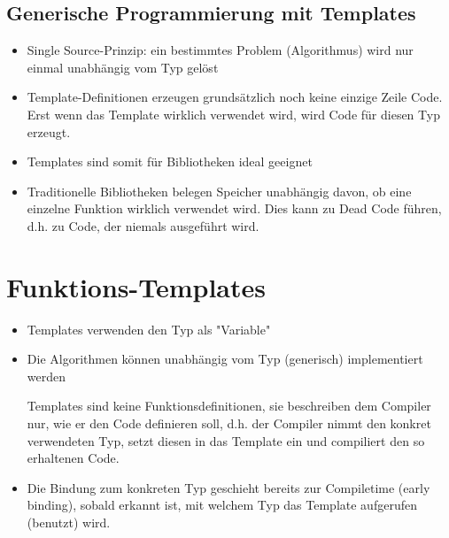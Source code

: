\subsection{Generische Programmierung mit Templates}
\label{sec:Generische Programmierung mit Templates}
\begin{itemize}
	\item Single Source-Prinzip: ein bestimmtes Problem (Algorithmus) wird nur einmal unabhängig vom Typ gelöst
	\item Template-Definitionen erzeugen grundsätzlich noch keine einzige Zeile Code. Erst wenn das Template wirklich verwendet wird, wird Code für diesen Typ erzeugt.
	\item Templates sind somit für Bibliotheken ideal geeignet
	\item Traditionelle Bibliotheken belegen Speicher unabhängig davon, ob eine einzelne Funktion wirklich verwendet wird. Dies kann zu Dead Code führen, d.h. zu Code, der niemals ausgeführt wird.
\end{itemize}

\section{Funktions-Templates}
\label{sec:Funktions-Templates}
\begin{itemize}
	\item Templates verwenden den Typ als "Variable"
	\item Die Algorithmen können unabhängig vom Typ (generisch) implementiert werden
	\begin{achtung} Templates sind keine Funktionsdefinitionen, sie beschreiben dem Compiler nur, wie er den Code definieren soll, d.h. der Compiler nimmt den konkret verwendeten Typ, setzt diesen in das Template ein und compiliert den so erhaltenen Code.
	\end{achtung}
	\item Die Bindung zum konkreten Typ geschieht bereits zur Compiletime (early binding), sobald erkannt ist, mit welchem Typ das Template aufgerufen (benutzt) wird.
\end{itemize}


